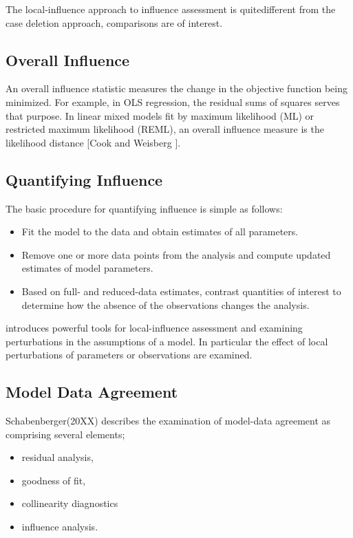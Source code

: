 \documentclass[12pt, a4paper]{article}
\begin{document}
The local-influence approach to influence assessment is quitedifferent from the case deletion approach, comparisons are of
interest.



\subsection{Overall Influence}
An overall influence statistic measures the change in the objective function being minimized. For example, in
OLS regression, the residual sums of squares serves that purpose. In linear mixed models fit by
 maximum likelihood (ML) or  restricted maximum likelihood (REML), an overall influence measure is the  likelihood distance [Cook and Weisberg ].






\subsection{Quantifying Influence}  %


The basic procedure for quantifying influence is simple as follows:


\begin{itemize}
	\item Fit the model to the data and obtain estimates of all parameters.
	\item Remove one or more data points from the analysis and compute updated estimates of model parameters.
	\item Based on full- and reduced-data estimates, contrast quantities of interest to determine how the absence of the observations changes the analysis.
\end{itemize}


\citet{cook86} introduces powerful tools for local-influence assessment and examining perturbations in the assumptions of a model. In particular the effect of local perturbations of parameters or observations are examined.







\subsection{Model Data Agreement}
Schabenberger(20XX) describes the examination of model-data agreement as comprising several elements; \begin{itemize}
	\item residual analysis, 
	\item goodness of fit, 
	\item collinearity diagnostics
	\item influence analysis.
\end{itemize}
\end{document}
